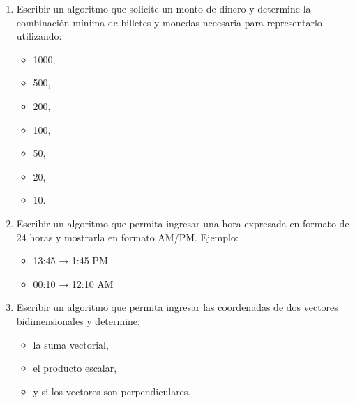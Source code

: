 \begin{ejercicioClase}
\begin{enumerate}
    \item Escribir un algoritmo que solicite un monto de dinero y determine la combinación mínima de billetes y monedas necesaria para representarlo utilizando:
      \begin{itemize}
        \item 1000,
        \item 500,
        \item 200,
        \item 100,
        \item 50,
        \item 20,
        \item 10.
      \end{itemize}

    \item Escribir un algoritmo que permita ingresar una hora expresada en formato de 24 horas y mostrarla en formato AM/PM.
    Ejemplo:

      \begin{itemize}
        \item 13:45 → 1:45 PM
        \item 00:10 → 12:10 AM
      \end{itemize}

    \item Escribir un algoritmo que permita ingresar las coordenadas de dos vectores bidimensionales y determine:

      \begin{itemize}
        \item la suma vectorial,
        \item el producto escalar,
        \item y si los vectores son perpendiculares.
      \end{itemize}

  \end{enumerate}
\end{ejercicioClase}

